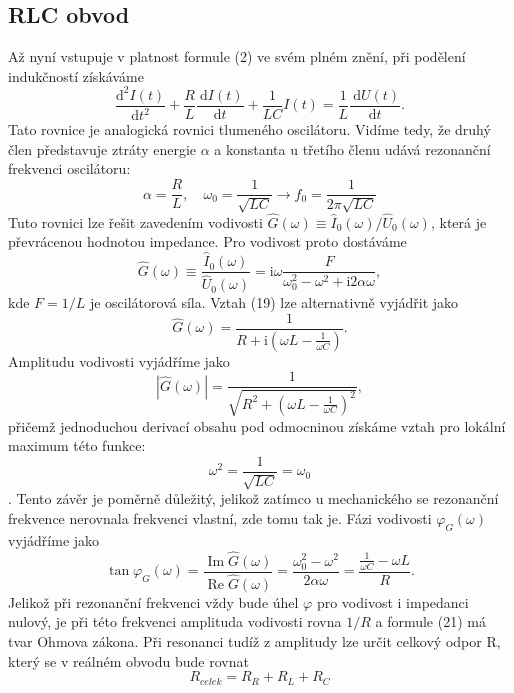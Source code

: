 \documentclass[czech,11pt,a4paper]{article}
\begin{document}
\begin{multicols}{2}
		\subsection{RLC obvod}
		Až nyní vstupuje v platnost formule (2) ve svém plném znění, při podělení indukčností získáváme
		\begin{equation}
			\frac{\mathrm{d}^{2} I(t)}{\mathrm{d} t^{2}}+\frac{R}{L} \frac{\mathrm{~d} I(t)}{\mathrm{d} t}+\frac{1}{L C} I(t)=\frac{1}{L} \frac{\mathrm{~d} U(t)}{\mathrm{d} t}.
		\end{equation}
		Tato rovnice je analogická rovnici tlumeného oscilátoru. Vidíme tedy, že druhý člen představuje ztráty energie $\alpha$ a konstanta u třetího členu udává rezonanční frekvenci oscilátoru:
		\begin{equation}
			\alpha = \frac{R}{L},\quad \omega_0 = \frac{1}{\sqrt{LC}} \rightarrow f_0 = \frac 1 {2\pi \sqrt{LC}}
		\end{equation}
		Tuto rovnici lze řešit zavedením vodivosti $\hat{G}(\omega) \equiv \hat{I}_{0}(\omega) / \hat{U}_{0}(\omega)$, která je převrácenou hodnotou impedance. Pro vodivost proto dostáváme
		\begin{equation}
			\hat{G}(\omega) \equiv \frac{\hat{I}_{0}(\omega)}{\hat{U}_{0}(\omega)}=\mathrm{i} \omega \frac{F}{\omega_{0}^{2}-\omega^{2}+\mathrm{i} 2 \alpha \omega},
		\end{equation}
		kde $F= 1/L$ je oscilátorová síla. Vztah (19) lze alternativně vyjádřit jako
		\begin{equation}
			\hat{G}(\omega)=\frac{1}{R+\mathrm{i}\left(\omega L-\frac{1}{\omega C}\right)} .
		\end{equation}
		Amplitudu vodivosti vyjádříme jako 
		\begin{equation}
			|\hat{G}(\omega)|=\frac{1}{\sqrt{R^{2}+\left(\omega L-\frac{1}{\omega C}\right)^{2}}},		
		\end{equation}
		přičemž jednoduchou derivací obsahu pod odmocninou získáme vztah pro lokální maximum této funkce:
		\begin{equation}
			\omega^2 = \frac{1}{\sqrt{LC}} = \omega_0
		\end{equation}.
		Tento závěr je poměrně důležitý, jelikož zatímco u mechanického se rezonanční frekvence nerovnala frekvenci vlastní, zde tomu tak je. 
		Fázi vodivosti $\varphi_G (\omega)$ vyjádříme jako
		\begin{equation}
			\tan \varphi_{G}(\omega)=\frac{\operatorname{Im} \hat{G}(\omega)}{\operatorname{Re} \hat{G}(\omega)}=\frac{\omega_{0}^{2}-\omega^{2}}{2 \alpha \omega}=\frac{\frac{1}{\omega C}-\omega L}{R} .
		\end{equation}
		Jelikož při rezonanční frekvenci vždy bude úhel $\varphi$ pro vodivost i impedanci nulový, je při této frekvenci amplituda vodivosti rovna $1/R$ a formule (21) má tvar Ohmova zákona. Při resonanci tudíž z amplitudy lze určit celkový odpor R, který se v reálném obvodu bude rovnat
		\begin{equation}
			R_{celek} = R_R + R_L + R_C
		\end{equation} 

\end{multicols}
\end{document}
